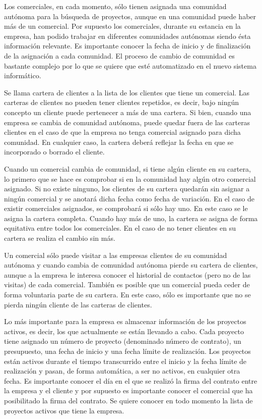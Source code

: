 \documentclass{db-practice}
\begin{document}
Los comerciales, en cada momento, sólo tienen asignada una comunidad autónoma para la búsqueda de proyectos, aunque en una comunidad puede haber más de un comercial. Por supuesto los comerciales, durante su estancia en la empresa, han podido trabajar en diferentes comunidades autónomas siendo ésta información relevante. Es importante conocer la fecha de inicio y de finalización de la asignación a cada comunidad. El proceso de cambio de comunidad es bastante complejo por lo que se quiere que esté automatizado en el nuevo sistema informático.

Se llama cartera de clientes a la lista de los clientes que tiene un comercial. Las carteras de clientes no pueden tener clientes repetidos, es decir, bajo ningún concepto un cliente puede pertenecer a más de una cartera. Si bien, cuando una empresa se cambia de comunidad autónoma, puede quedar fuera de las carteras clientes en el caso de que la empresa no tenga comercial asignado para dicha comunidad. En cualquier caso, la cartera deberá reflejar la fecha en que se incorporado o borrado el cliente.

Cuando un comercial cambia de comunidad, si tiene algún cliente en su cartera, lo primero que se hace es comprobar si en la comunidad hay algún otro comercial asignado. Si no existe ninguno, los clientes de su cartera quedarán sin asignar a ningún comercial y se anotará dicha fecha como fecha de variación. En el caso de existir comerciales asignados, se comprobará si sólo hay uno. En este caso se le asigna la cartera completa. Cuando hay más de uno, la cartera se asigna de forma equitativa entre todos los comerciales. En el caso de no tener clientes en su cartera se realiza el cambio sin más.

Un comercial sólo puede visitar a las empresas clientes de su comunidad autónoma y cuando cambia de comunidad autónoma pierde su cartera de clientes, aunque a la empresa le interesa conocer el historial de contactos (pero no de las visitas) de cada comercial. También es posible que un comercial pueda ceder de forma voluntaria parte de su cartera. En este caso, sólo es importante que no se pierda ningún cliente de las carteras de clientes. 

Lo más importante para la empresa es almacenar información de los proyectos activos, es decir, los que actualmente se están llevando a cabo. Cada proyecto tiene asignado un número de proyecto (denominado número de contrato), un presupuesto, una fecha de inicio y una fecha límite de realización. Los proyectos están activos durante el tiempo transcurrido entre el inicio y la fecha límite de realización y pasan, de forma automática, a ser no activos, en cualquier otra fecha. Es importante conocer el día en el que se realizó la firma del contrato entre la empresa y el cliente y por supuesto es importante conocer el comercial que ha posibilitado la firma del contrato. Se quiere conocer en todo momento la lista de proyectos activos que tiene la empresa.
\end{document}
